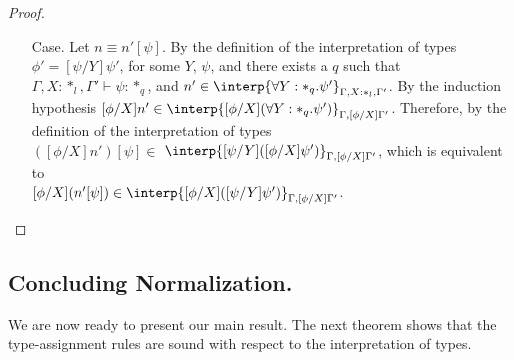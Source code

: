 \begin{proof}
\begin{itemize}
\item[Case.]  Let $n \equiv n'[\psi]$.  By the definition of the
  interpretation of types $\phi' = [\psi/Y]\psi'$, for some $Y$, $\psi$, and 
  there exists a $q$ such that $\Gamma,X:*_l,\Gamma' \vdash \psi:*_q$, and 
  $n' \in \interp{\forall Y:*_q.\psi'}_{\Gamma,X:*_l,\Gamma'}$.  By the 
  induction hypothesis 
  $[\phi/X]n' \in \interp{[\phi/X](\forall Y:*_q.\psi')}_{\Gamma,[\phi/X]\Gamma'}$.
  Therefore, by the definition of the interpretation of types\\
  $([\phi/X]n')[\psi] \in$
  $ \interp{[\psi/Y]([\phi/X]\psi')}_{\Gamma,[\phi/X]\Gamma'}$, which is equivalent
  to \\
  $[\phi/X](n'[\psi]) \in \interp{[\phi/X]([\psi/Y]\psi')}_{\Gamma,[\phi/X]\Gamma'}$.
\end{itemize}
\end{proof}

\subsection{Concluding Normalization.}
\label{subsec:soundness_of_typing_ssf}
We are now ready to present our main result.  The next theorem shows
that the type-assignment rules are sound with respect to the
interpretation of types.  

